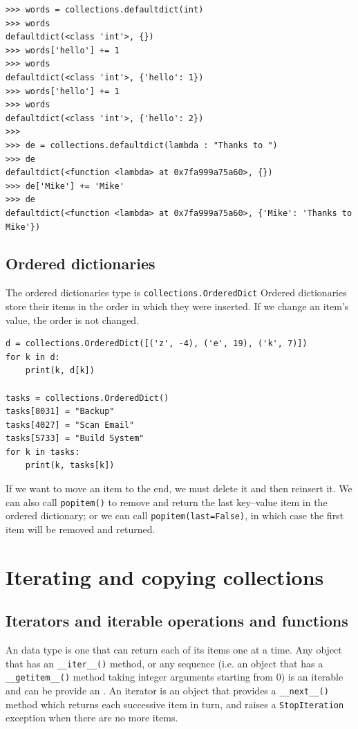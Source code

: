 \begin{lstlisting}
>>> words = collections.defaultdict(int)
>>> words
defaultdict(<class 'int'>, {})
>>> words['hello'] += 1
>>> words
defaultdict(<class 'int'>, {'hello': 1})
>>> words['hello'] += 1
>>> words
defaultdict(<class 'int'>, {'hello': 2})
>>> 
>>> de = collections.defaultdict(lambda : "Thanks to ")
>>> de
defaultdict(<function <lambda> at 0x7fa999a75a60>, {})
>>> de['Mike'] += 'Mike'
>>> de
defaultdict(<function <lambda> at 0x7fa999a75a60>, {'Mike': 'Thanks to Mike'})  
\end{lstlisting}


\subsection{Ordered dictionaries}
The ordered dictionaries type is \verb|collections.OrderedDict|
Ordered dictionaries store their items in the order in which they were inserted.
If we change an item's value, the order is not changed.


\begin{lstlisting}
d = collections.OrderedDict([('z', -4), ('e', 19), ('k', 7)])
for k in d:
    print(k, d[k])
    
tasks = collections.OrderedDict()
tasks[8031] = "Backup"
tasks[4027] = "Scan Email"
tasks[5733] = "Build System"
for k in tasks:
    print(k, tasks[k])  
\end{lstlisting}


If we want to move an item to the end, we must delete it and then reinsert it.
We can also call \verb|popitem()| to remove and return the last key–value item in the ordered dictionary; or we can call
\verb|popitem(last=False)|, in which case the first item will be removed and returned.



\section{Iterating and copying collections}

\subsection{Iterators and iterable operations and functions}

An  data type is one that can return each of its items one at a time.
Any object that has an \verb|__iter__()| method, or any sequence (i.e. an object that has a \verb|__getitem__()| method taking integer arguments starting from 0) is an iterable and can be provide an .
An iterator is an object that provides a \verb|__next__()| method which returns each successive item in turn, and raises a \verb|StopIteration| exception when there are no more items.


